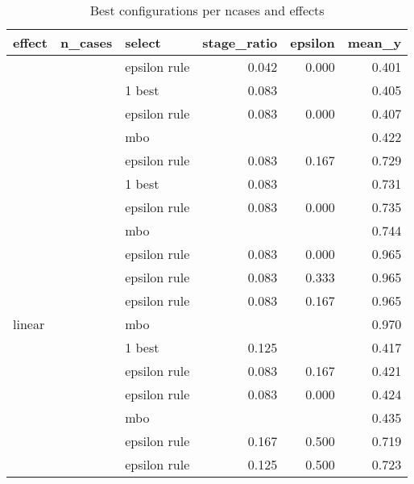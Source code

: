 \begin{table}

\caption{\label{tab:table_best}Best configurations per ncases and effects}
\centering
\fontsize{6}{8}\selectfont
\begin{tabular}[t]{lrlrrr}
\toprule
effect & n\_cases & select & stage\_ratio & epsilon & mean\_y\\
\midrule
 &  & epsilon rule & 0.042 & 0.000 & 0.401\\

 &  & 1 best & 0.083 &  & 0.405\\

 &  & epsilon rule & 0.083 & 0.000 & 0.407\\

 & \multirow{-4}{*}{\raggedleft\arraybackslash 500} & mbo &  &  & 0.422\\
\cmidrule{2-6}
 &  & epsilon rule & 0.083 & 0.167 & 0.729\\

 &  & 1 best & 0.083 &  & 0.731\\

 &  & epsilon rule & 0.083 & 0.000 & 0.735\\

 & \multirow{-4}{*}{\raggedleft\arraybackslash 1000} & mbo &  &  & 0.744\\
\cmidrule{2-6}
 &  & epsilon rule & 0.083 & 0.000 & 0.965\\

 &  & epsilon rule & 0.083 & 0.333 & 0.965\\

 &  & epsilon rule & 0.083 & 0.167 & 0.965\\

\multirow{-12}{*}{\raggedright\arraybackslash linear} & \multirow{-4}{*}{\raggedleft\arraybackslash 2000} & mbo &  &  & 0.970\\
\cmidrule{1-6}
 &  & 1 best & 0.125 &  & 0.417\\

 &  & epsilon rule & 0.083 & 0.167 & 0.421\\

 &  & epsilon rule & 0.083 & 0.000 & 0.424\\

 & \multirow{-4}{*}{\raggedleft\arraybackslash 500} & mbo &  &  & 0.435\\
\cmidrule{2-6}
 &  & epsilon rule & 0.167 & 0.500 & 0.719\\

 &  & epsilon rule & 0.125 & 0.500 & 0.723\\


\end{tabular}
\end{table}
